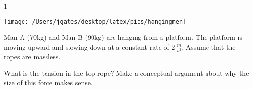 
\AddToShipoutPicture*{\BackgroundPic}

\addtocounter {ProbNum} {1}

\begin{floatingfigure}[r]{.33\textwidth}
\texttt{[image: /Users/jgates/desktop/latex/pics/hangingmen]}
\end{floatingfigure}
 
{\bf \Large{}}Man A (70kg) and Man B (90kg) are hanging from a platform.  The platform is moving upward and slowing down at a constant rate of ${2~\tfrac{m}{s^2}}$. Assume that the ropes are massless. 

\bigskip
What is the tension in the top rope? Make a conceptual argument about why the size of this force makes sense.



\vfill
\newpage
